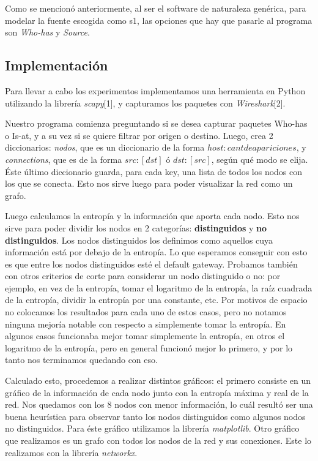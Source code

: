 Como se mencionó anteriormente, al ser el software de naturaleza genérica, para modelar la fuente escogida como s1, las opciones que hay que pasarle al programa son \textit{Who-has} y \textit{Source}.


\subsection{Implementación}
Para llevar a cabo los experimentos implementamos una herramienta en Python utilizando la librería \textit{scapy}[1], y capturamos los paquetes con \textit{Wireshark}[2].

Nuestro programa comienza preguntando si se desea capturar paquetes Who-has o Is-at, y a su vez si se quiere filtrar por origen o destino. Luego, crea 2 diccionarios: \textit{nodos}, que es un diccionario de la forma ${host: cant de apariciones}$, y \textit{connections}, que es de la forma ${src: [dst] }$ ó ${dst: [src] }$, según qué modo se elija. Éste último diccionario guarda, para cada key, una lista de todos los nodos con los que se conecta. Esto nos sirve luego para poder visualizar la red como un grafo.

Luego calculamos la entropía y la información que aporta cada nodo. Esto nos sirve para poder dividir los nodos en 2 categorías: \textbf{distinguidos} y \textbf{no distinguidos}. Los nodos distinguidos los definimos como aquellos cuya información está por debajo de la entropía. Lo que esperamos conseguir con esto es que entre los nodos distinguidos esté el default gateway. Probamos también con otros criterios de corte para considerar un nodo distinguido o no: por ejemplo, en vez de la entropía, tomar el logaritmo de la entropía, la raíz cuadrada de la entropía, dividir la entropía por una constante, etc. Por motivos de espacio no colocamos los resultados para cada uno de estos casos, pero no notamos ninguna mejoría notable con respecto a simplemente tomar la entropía. En algunos casos funcionaba mejor tomar simplemente la entropía, en otros el logaritmo de la entropía, pero en general funcionó mejor lo primero, y por lo tanto nos terminamos quedando con eso.

Calculado esto, procedemos a realizar distintos gráficos: el primero consiste en un gráfico de la información de cada nodo junto con la entropía máxima y real de la red. Nos quedamos con los 8 nodos con menor información, lo cuál resultó ser una buena heurística para observar tanto los nodos distinguidos como algunos nodos no distinguidos. Para éste gráfico utilizamos la librería \textit{matplotlib}. Otro gráfico que realizamos es un grafo con todos los nodos de la red y sus conexiones. Este lo realizamos con la librería \textit{networkx}.

